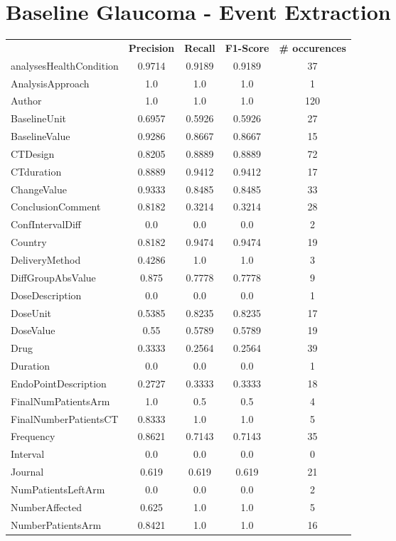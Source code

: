 \section{Baseline Glaucoma - Event Extraction}
\begin{longtable}{ l c c c c}
 & \textbf{Precision} & \textbf{Recall} & \textbf{F1-Score} & \textbf{\# occurences} \\ \cline{1-5}
analysesHealthCondition & 0.9714 & 0.9189 & 0.9189 & 37\\
AnalysisApproach & 1.0 & 1.0 & 1.0 & 1\\
Author & 1.0 & 1.0 & 1.0 & 120\\
BaselineUnit & 0.6957 & 0.5926 & 0.5926 & 27\\
BaselineValue & 0.9286 & 0.8667 & 0.8667 & 15\\
CTDesign & 0.8205 & 0.8889 & 0.8889 & 72\\
CTduration & 0.8889 & 0.9412 & 0.9412 & 17\\
ChangeValue & 0.9333 & 0.8485 & 0.8485 & 33\\
ConclusionComment & 0.8182 & 0.3214 & 0.3214 & 28\\
ConfIntervalDiff & 0.0 & 0.0 & 0.0 & 2\\
Country & 0.8182 & 0.9474 & 0.9474 & 19\\
DeliveryMethod & 0.4286 & 1.0 & 1.0 & 3\\
DiffGroupAbsValue & 0.875 & 0.7778 & 0.7778 & 9\\
DoseDescription & 0.0 & 0.0 & 0.0 & 1\\
DoseUnit & 0.5385 & 0.8235 & 0.8235 & 17\\
DoseValue & 0.55 & 0.5789 & 0.5789 & 19\\
Drug & 0.3333 & 0.2564 & 0.2564 & 39\\
Duration & 0.0 & 0.0 & 0.0 & 1\\
EndoPointDescription & 0.2727 & 0.3333 & 0.3333 & 18\\
FinalNumPatientsArm & 1.0 & 0.5 & 0.5 & 4\\
FinalNumberPatientsCT & 0.8333 & 1.0 & 1.0 & 5\\
Frequency & 0.8621 & 0.7143 & 0.7143 & 35\\
Interval & 0.0 & 0.0 & 0.0 & 0\\
Journal & 0.619 & 0.619 & 0.619 & 21\\
NumPatientsLeftArm & 0.0 & 0.0 & 0.0 & 2\\
NumberAffected & 0.625 & 1.0 & 1.0 & 5\\
NumberPatientsArm & 0.8421 & 1.0 & 1.0 & 16\\

\end{longtable}
